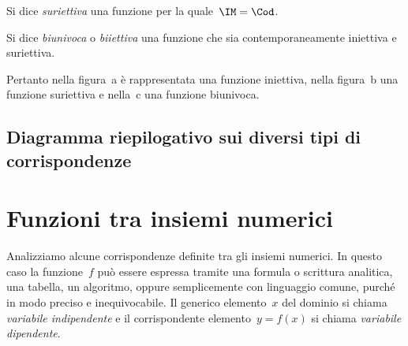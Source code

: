 \begin{definizione}
Si dice \emph{suriettiva} una funzione per la quale~$\IM = \Cod$.
\end{definizione}

\begin{definizione}
Si dice \emph{biunivoca} o \emph{biiettiva} una funzione che sia
contemporaneamente iniettiva e suriettiva.
\end{definizione}

Pertanto nella figura~a è rappresentata una funzione iniettiva, nella figura~b una
funzione suriettiva e nella~c una funzione biunivoca.

 \vspazio\ovalbox{\risolvii \ref{ese:D.5}, \ref{ese:D.6}}
\subsection{Diagramma riepilogativo sui diversi tipi di corrispondenze}
\begin{center}
 
\end{center}

\section{Funzioni tra insiemi numerici}

Analizziamo alcune corrispondenze definite tra gli insiemi numerici. In
questo caso la funzione~$f$ può essere espressa
tramite una formula o scrittura analitica, una tabella, un algoritmo,
oppure semplicemente con linguaggio comune, purché in modo preciso e
inequivocabile. Il generico elemento~$x$ del dominio si chiama
\emph{variabile indipendente} e il corrispondente elemento~$y =f(x)$ si chiama \emph{variabile dipendente}.

